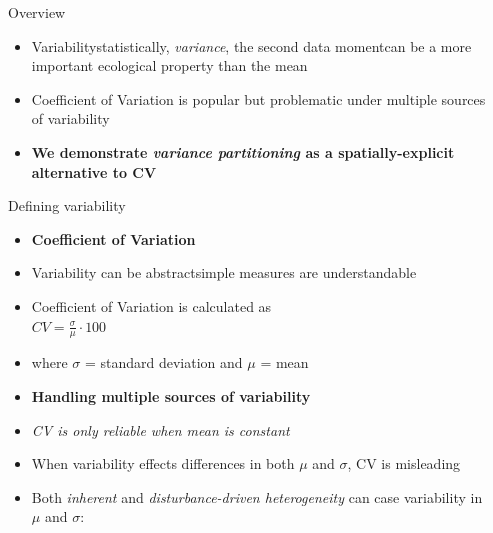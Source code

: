 \begin{frame}[t] %

\begin{columns}[t] %

\begin{column}{\sepwid}\end{column} %

\begin{column}{\onecolwid} %


\vspace{-1cm}
\begin{alertblock}{	Overview }
	
\begin{itemize}
	\item Variability\textemdash statistically, \emph{variance}, the second data moment\textemdash can be a more important ecological property than the mean 
\item Coefficient of Variation is popular but problematic under multiple sources of variability 
\item \textbf{We demonstrate \emph{variance partitioning} as a spatially-explicit alternative to CV}
\end{itemize} 
\end{alertblock}

\begin{block}{Defining variability}
\begin{itemize}
	\item[] \textbf{Coefficient of Variation}
\item Variability can be abstract\textemdash simple measures are understandable 
\item Coefficient of Variation is calculated as \\
	$CV = \frac{\sigma}{\mu} \cdot 100 $ 
\item[] where $\sigma$ = standard deviation and $\mu$ = mean
\item[] \textbf{Handling multiple sources of variability} 
\item \emph{CV is only reliable when mean is constant}
\item When variability effects differences in both $\mu$ and $\sigma$, CV is misleading
\item Both \emph{inherent} and \emph{disturbance-driven heterogeneity} can case variability in $\mu$ and $\sigma$:
\end{itemize}


\end{block}
\end{column}
\end{columns}
\end{frame}
